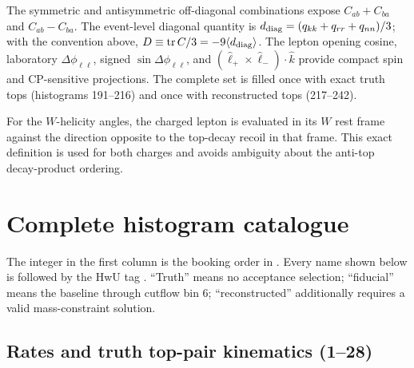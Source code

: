 \documentclass[10pt,a4paper]{article}
\newcommand{\ddphi}{\Delta\phi}
\newcommand{\code}[1]{\texttt{\detokenize{#1}}}
\begin{document}
The symmetric and antisymmetric off-diagonal combinations expose
\(C_{ab}\!+C_{ba}\) and \(C_{ab}\!-C_{ba}\).  The event-level diagonal
quantity is
\(d_{\rm diag}=(q_{kk}+q_{rr}+q_{nn})/3\); with the convention above,
\(D\equiv\operatorname{tr}C/3=-9\langle d_{\rm diag}\rangle\).
The lepton opening cosine, laboratory \(\ddphi_{\ell\ell}\), signed
\(\sin\ddphi_{\ell\ell}\), and
\((\hat\ell_+\times\hat\ell_-)\cdot\hat k\) provide compact spin and
CP-sensitive projections.  The complete set is filled once with exact truth
tops (histograms 191--216) and once with reconstructed tops (217--242).

For the \(W\)-helicity angles, the charged lepton is evaluated in its \(W\)
rest frame against the direction opposite to the top-decay recoil in that
frame.  This exact definition is used for both charges and avoids ambiguity
about the anti-top decay-product ordering.

\section{Complete histogram catalogue}

The integer in the first column is the booking order in
\code{MADatNLO.HwU}.  Every name shown below is followed by the HwU tag
\code{|T@NLO}.  ``Truth'' means no acceptance selection; ``fiducial'' means
the baseline through cutflow bin 6; ``reconstructed'' additionally requires a
valid mass-constraint solution.

\subsection{Rates and truth top-pair kinematics (1--28)}
\end{document}
